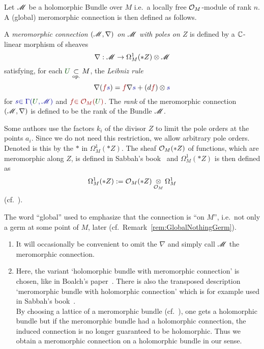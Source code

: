 Let $\mathscr{M}$ be a holomorphic Bundle over $M$ i.e.\ a locally free $\mathcal{O}_M$-module
of rank $n$.
A (global) meromorphic connection is then defined as follows.
\begin{defn}\label{defn:mercon}
  \def\myU{\textcolor{green!30!black}{U}}
  \def\mys{\textcolor{blue!60!black}{s}}
  \def\myf{\textcolor{red!60!black}{f}}
  A \emph{meromorphic connection $(\mathscr{M},\nabla)$ on $\mathscr{M}$ with poles on $Z$}
  is defined by a $\mathbb{C}$-linear morphism of sheaves
  \[
    \nabla:\mathscr{M}\to\Omega_M^1(*Z)\otimes\mathscr{M}
  \]
  satisfying, for each $\myU\underset{\text{op.}}{\subset} M$, the
  \emph{Leibniz rule}
    \[
      \nabla(\myf\mys)=\myf\nabla\mys+(d\myf)\otimes\mys
    \]
  for $\mys\textcolor{blue!60!black}{\in\Gamma(\myU,\sM)}$ and
  $\myf\textcolor{red!60!black}{\in\cO_M(\myU)}$.
  The \emph{rank} of the meromorphic connection $(\mathscr{M},\nabla)$ is defined to be
  the rank of the Bundle $\mathscr{M}$.
  \begin{s-rem}
    Some authors use the factors $k_i$ of the divisor $Z$ to limit the pole
    orders at the points $a_i$. Since we do not need this restriction, we allow
    arbitrary pole orders. Denoted is this by the $*$ in $\Omega_M^1(*Z)$.
    The sheaf $\mathcal{O}_M(*Z)$ of functions, which are meromorphic along $Z$, is
    defined in Sabbah's book~\cite[Sec.0.8]{sabbah2007isomonodromic} and
    $\Omega_M^1(*Z)$ is then defined as
    \[
      \Omega_M^1(*Z):=\mathcal{O}_M(*Z)\underset{\mathcal{O}_M}\otimes\Omega_M^1
    \]
     (cf.\
    \cite[Sec.0.9.b]{sabbah2007isomonodromic}).
  \end{s-rem}
\end{defn}
The word ``global'' used to emphasize that the connection is ``on $M$'', i.e.\
not only a germ at some point of $M$,  later
(cf.\ Remark~\ref{rem:GlobalNothingGerm}).
\begin{rem}
  \begin{enumerate}
    \item It will occasionally be convenient to omit the $\nabla$ and simply
      call $\mathscr{M}$ the meromorphic connection.
    \item Here, the variant `holomorphic bundle with meromorphic connection' is
      chosen, like in Boalch's paper~\cite{boalch}.
      There is also the transposed description `meromorphic bundle with
      holomorphic connection' which is for example used in Sabbah's
      book~\cite{sabbah2007isomonodromic}.
      \\By choosing a lattice of a meromorphic bundle (cf.\
      \cite[Def.0.8.3]{sabbah2007isomonodromic}), one gets a holomorphic bundle
      but if the meromorphic bundle had a holomorphic connection, the induced
      connection \rewrite{on the lattice} is no longer guaranteed to be
      holomorphic.
      Thus we obtain a meromorphic connection on a holomorphic bundle in our
      sense.
  \end{enumerate}
\end{rem}

